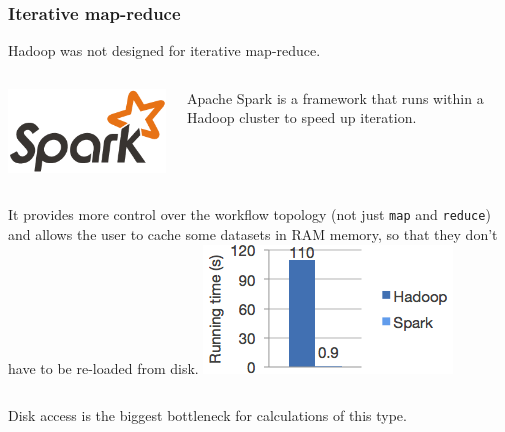 \documentclass[compress]{beamer}
\begin{document}
\begin{frame}
\frametitle{Iterative map-reduce}

Hadoop was not designed for iterative map-reduce.

\vspace{0.5 cm}

\begin{columns}
\includegraphics[width=\linewidth]{PLOTS/spark-logo.png}

\vspace{0.2 cm}
Apache Spark is a framework that runs within a Hadoop cluster to speed up iteration.
\end{columns}

\vfill
\begin{columns}
It provides more control over the workflow topology (not just {\tt map} and {\tt reduce}) and allows the user to cache some datasets in RAM memory, so that they don't have to be re-loaded from disk.
\includegraphics[width=\linewidth]{PLOTS/spark_time.png}
\end{columns}

\vspace{0.5 cm}
Disk access is the biggest bottleneck for calculations of this type.
\end{frame}
\end{document}
